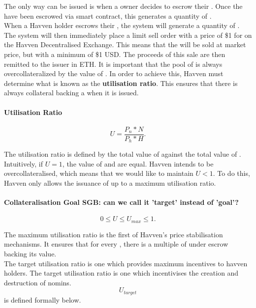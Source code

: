 The only way \NOM{} can be issued is when a \HAV{} owner decides to escrow their \HAV{}. Once the \HAV{} have been escrowed via smart contract, this generates a quantity of \NOM{}. \\

\noindent When a Havven holder escrows their \HAV{}, the system will generate a quantity of \NOM{}. The system will then immediately place a limit sell order with a price of \$1 for on the Havven Decentralised Exchange. This means that the \NOM{} will be sold at market price, but with a minimum of \$1 USD. The proceeds of this sale are then remitted to the issuer in ETH. It is important that the pool of \NOM{} is always overcollateralized by the value of \HAV{}. In order to achieve this, Havven must determine what is known as the \textbf{utilisation ratio}. This ensures that there is always collateral backing a \NOM{} when it is issued.\\

\paragraph{Utilisation Ratio}

$$ U = \frac{P_n * N}{P_h * H}. $$

\noindent The utilisation ratio is defined by the total value of \NOM{} against the total value of \HAV{}. Intuitively, if $U = 1$, the value of \NOM{} and \HAV{} are equal. Havven intends to be overcollateralised, which means that we would like to maintain $U <  1$. To do this, Havven only allows the issuance of \NOM{} up to a maximum utilisation ratio. \\

\paragraph{Collateralisation Goal SGB: can we call it 'target' instead of 'goal'?}

$$ 0 \leq U \leq U_{max} \leq 1.$$

\noindent The maximum utilisation ratio is the first of Havven's price stabilisation mechanisms. It ensures that for every \NOM{}, there is a multiple of \HAV{} under escrow backing its value. \\

\noindent The target utilisation ratio is one which provides maximum incentives to havven holders. The target utilisation ratio is one which incentivises the creation and destruction of nomins. $$U_{target}$$ is defined formally below. \\

